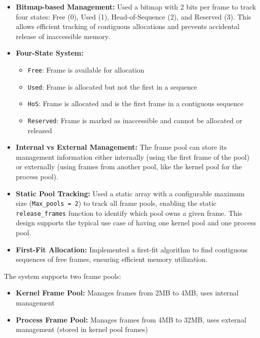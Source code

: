 \documentclass{article}
\begin{document}
\begin{itemize}
    \item \textbf{Bitmap-based Management:} Used a bitmap with 2 bits per frame to track four states: Free (0), Used (1), Head-of-Sequence (2), and Reserved (3). This allows efficient tracking of contiguous allocations and prevents accidental release of inaccessible memory.
    
    \item \textbf{Four-State System:} 
    \begin{itemize}
        \item \texttt{Free}: Frame is available for allocation
        \item \texttt{Used}: Frame is allocated but not the first in a sequence
        \item \texttt{HoS}: Frame is allocated and is the first frame in a contiguous sequence
        \item \texttt{Reserved}: Frame is marked as inaccessible and cannot be allocated or released
    \end{itemize}
    
    \item \textbf{Internal vs External Management:} The frame pool can store its management information either internally (using the first frame of the pool) or externally (using frames from another pool, like the kernel pool for the process pool).
    
    \item \textbf{Static Pool Tracking:} Used a static array with a configurable maximum size (\texttt{Max\_pools = 2}) to track all frame pools, enabling the static \texttt{release\_frames} function to identify which pool owns a given frame. This design supports the typical use case of having one kernel pool and one process pool.
    
    \item \textbf{First-Fit Allocation:} Implemented a first-fit algorithm to find contiguous sequences of free frames, ensuring efficient memory utilization.
\end{itemize}

The system supports two frame pools:
\begin{itemize}
    \item \textbf{Kernel Frame Pool:} Manages frames from 2MB to 4MB, uses internal management
    \item \textbf{Process Frame Pool:} Manages frames from 4MB to 32MB, uses external management (stored in kernel pool frames)
\end{itemize}
\end{document}
